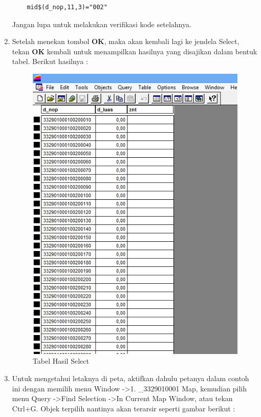\begin{enumerate}[1.]
  \begin{lstlisting}
    mid$(d_nop,11,3)="002"
  \end{lstlisting}
  
  Jangan lupa untuk melakukan verifikasi kode setelahnya.
  
  \item Setelah menekan tombol \textbf{OK}, maka akan kembali lagi ke jendela Select, tekan \textbf{OK} kembali untuk menampilkan hasilnya yang disajikan dalam bentuk tabel. Berikut hasilnya :
  
  \begin{figure}[H]
    \centering
    \includegraphics[width=1\textwidth]{./resources/072-hasil-select}
    \caption{Tabel Hasil Select}
  \end{figure}
  
  \item Untuk mengetahui letaknya di peta, aktifkan dahulu petanya dalam contoh ini dengan memilih menu Window -\textgreater 1. \_3329010001 Map, kemudian pilih menu Query -\textgreater Find Selection -\textgreater In Current Map Window, atau tekan Ctrl+G. Objek terpilih nantinya akan terarsir seperti gambar berikut :
  

\end{enumerate}

